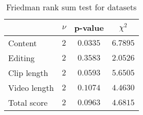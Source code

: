 \begin{table}[ht]
	\begin{center}
	\caption{Friedman rank sum test for datasets}
	\label{tab:fried_dataset}
		\begin{tabular}{lccc}
		\toprule
			 & $\nu$ & p-value & $\chi^2$\\
			\midrule
			Content & $2$ & $0.0335$ & $6.7895$\\
			Editing & $2$ & $0.3583$ & $2.0526$\\
			Clip length & $2$ & $0.0593$ & $5.6505$\\
			Video length & $2$ & $0.1074$ & $4.4630$\\
			Total score & $2$ & $0.0963$ & $4.6815$\\
		\bottomrule
		\end{tabular}
	\end{center}
\end{table}